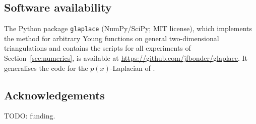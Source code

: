 \documentclass[11pt]{amsart}
\theoremstyle{definition}
\theoremstyle{remark}
\numberwithin{equation}{section}
\begin{document}
\subsection*{Software availability}
The Python package \texttt{glaplace} (NumPy/SciPy; MIT license), which implements the method for arbitrary Young functions on general two-dimensional triangulations and contains the scripts for all experiments of Section~\ref{sec:numerics}, is available at \url{https://github.com/jfbonder/glaplace}. It generalises the code for the $p(x)$-Laplacian of \cite{AragonFBRubio2023}.

\subsection*{Acknowledgements}
TODO: funding.
\end{document}
